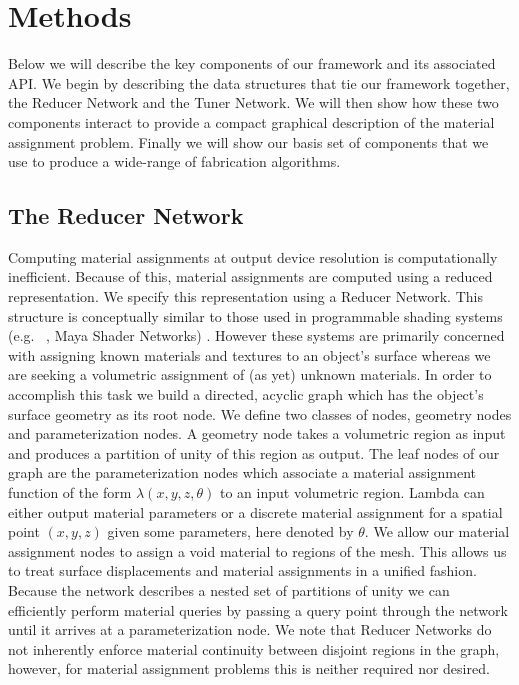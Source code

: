 \documentclass[annual]{acmsiggraph}
\begin{document}
\section{Methods}
Below we will describe the key components of our framework and its associated API. We begin by describing the data structures that tie our framework together, the Reducer Network and the Tuner Network. We will then show how these two components interact to provide a compact graphical description of the material assignment problem. Finally we will show our basis set of components that we use to produce a wide-range of fabrication algorithms. 
\subsection{The Reducer Network}
Computing material assignments at output device resolution is computationally inefficient. Because of this, material assignments are computed  using a reduced representation. We specify this representation using a Reducer Network.  This structure is conceptually similar to those used in programmable shading systems (e.g. ~\cite{Cook1984}, Maya Shader Networks) . However these systems are primarily concerned with assigning known materials and textures to an object's surface whereas we are seeking a volumetric assignment of (as yet) unknown materials. In order to accomplish this task we build a directed, acyclic graph which has the object's surface geometry as its root node. We define two classes of nodes, geometry nodes and parameterization nodes. A geometry node takes a volumetric region as input and produces a partition of unity of this region as output. The leaf nodes of our graph are the parameterization nodes which associate a material assignment function of the form $\lambda\left(x,y,z,\theta\right)$ to an input volumetric region. Lambda can either output material parameters or a discrete material assignment for a spatial point $\left(x,y,z\right)$ given some parameters, here denoted by $\theta$. We allow our material assignment nodes to assign a void material to regions of the mesh. This allows us to treat surface displacements and material assignments in a unified fashion. Because the network describes a nested set of partitions of unity we can efficiently perform material queries by passing a query point through the network until it arrives at a parameterization node. We note that Reducer Networks do not inherently enforce material continuity between disjoint regions in the graph, however, for material assignment problems this is neither required nor desired. 
\end{document}
